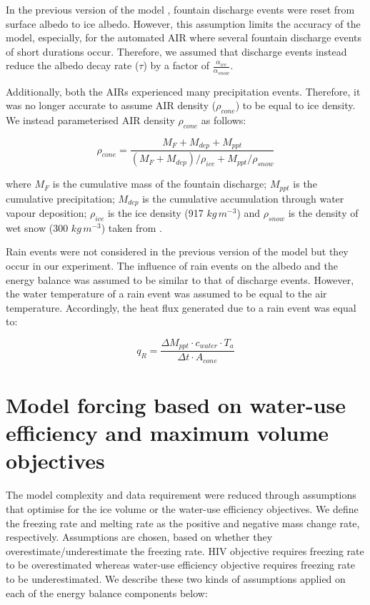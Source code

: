 \documentclass[tc, manuscript]{copernicus}
\begin{document}
In the previous version of the model \citep{balasubramanianInfluenceMeteorologicalConditions2022}, fountain
discharge events were reset from surface albedo to ice albedo. However, this assumption limits the accuracy of
the model, especially, for the automated AIR where several fountain discharge events of short durations occur.
Therefore, we assumed that discharge events instead reduce the albedo decay rate ($\tau$) by a 
factor of $\frac{\alpha_{ice}}{\alpha_{snow}}$.

Additionally, both the AIRs experienced many precipitation events. Therefore, it was no longer accurate to
assume AIR density ($\rho_{cone}$) to be equal to ice density. We instead parameterised AIR density $\rho_{cone}$ as follows:

\begin{equation}
  \rho_{cone} = \frac{M_{F} + M_{dep} + M_{ppt}}{(M_{F} + M_{dep})/\rho_{ice} + M_{ppt}/\rho_{snow}}
\end{equation}

where $M_F$ is the cumulative mass of the fountain discharge; $M_{ppt}$ is the cumulative precipitation;
$M_{dep}$ is the cumulative accumulation through water vapour deposition; $\rho_{ice}$ is the ice density (917
$kg\,m^{-3}$) and $\rho_{snow}$ is the density of wet snow (300 $kg\,m^{-3}$) taken from
\cite{cuffeyPhysicsGlaciers2010} .

Rain events were not considered in the previous version of the model but they occur in our experiment. The
influence of rain events on the albedo and the energy balance was assumed to be similar to that of discharge
events. However, the water temperature of a rain event was assumed to be equal to the air temperature.
Accordingly, the heat flux generated due to a rain event was equal to:

\begin{equation}
  q_{R} = \frac{\Delta M_{ppt} \cdot c_{water} \cdot T_{a}}{\Delta t \cdot A_{cone}}
\end{equation}

\section{Model forcing based on water-use efficiency and maximum volume objectives} \label{sec:SEB}

The model complexity and data requirement \citep{balasubramanianInfluenceMeteorologicalConditions2022} were
reduced through assumptions that optimise for the ice volume or the water-use efficiency objectives. We define
the freezing rate and melting rate as the positive and negative mass change rate, respectively. Assumptions are
chosen, based on whether they overestimate/underestimate the freezing rate. HIV objective requires freezing rate
to be overestimated whereas water-use efficiency objective requires freezing rate to be underestimated. We
describe these two kinds of assumptions applied on each of the energy balance components below: 
\end{document}
